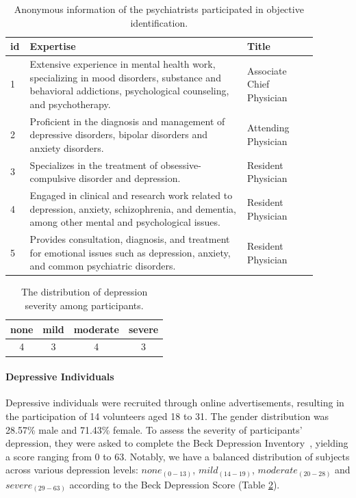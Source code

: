 \begin{table}[th]
    \small
    \centering
    \begin{tabular}{m{0.03\linewidth}m{0.65\linewidth}m{0.21\linewidth}}
    \hline
     id & Expertise & Title  \\ 
    \hline
    1 & Extensive experience in mental health work, specializing in mood disorders, substance and behavioral addictions, psychological counseling, and psychotherapy. & Associate Chief Physician \\
    \hline
    2 & Proficient in the diagnosis and management of depressive disorders, bipolar disorders and anxiety disorders. & Attending Physician\\
    \hline
    3 & Specializes in the treatment of obsessive-compulsive disorder and depression. & Resident Physician\\
    \hline
    4 & Engaged in clinical and research work related to depression, anxiety, schizophrenia, and dementia, among other mental and psychological issues. & Resident Physician \\
    \hline
    5 & Provides consultation, diagnosis, and treatment for emotional issues such as depression, anxiety, and common psychiatric disorders. & Resident Physician\\
    \hline
    \end{tabular}
    \caption{Anonymous information of the psychiatrists participated in objective identification.}
    \label{tab:psych_info}
\end{table}

\begin{table}[th]
    \small
    \centering
    \begin{tabular}{cccc}
    \hline
     none & mild & moderate & severe \\ 
    \hline
    4 & 3 &4 & 3 \\
    \hline
    \end{tabular}
    \caption{The distribution of depression severity among participants.}
    \label{tab:distribution_seve}
\end{table}
\paragraph{Depressive Individuals} 
Depressive individuals were recruited through online advertisements, resulting in the participation of 14 volunteers aged 18 to 31. The gender distribution was 28.57\% male and 71.43\% female. 
To assess the severity of participants' depression, they were asked to complete the Beck Depression Inventory~\cite{beck1996beck}, yielding a score ranging from 0 to 63. Notably, we have a balanced distribution of subjects across various depression levels: $none_{(0-13)}$, $mild_{(14-19)}$, $moderate_{(20-28)}$ and $severe_{(29-63)}$ according to the Beck Depression Score (Table \ref{tab:distribution_seve}).


